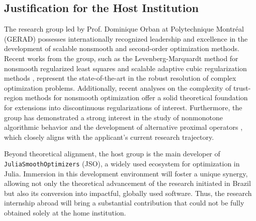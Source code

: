 \subsection{Justification for the Host Institution}
The research group led by Prof. Dominique Orban at Polytechnique Montréal (GERAD) possesses internationally recognized leadership and excellence in the development of scalable nonsmooth and second-order optimization methods. Recent works from the group, such as the Levenberg-Marquardt method for nonsmooth regularized least squares \cite{aravkin2024levenberg} and scalable adaptive cubic regularization methods \cite{dussault2024scalable}, represent the state-of-the-art in the robust resolution of complex optimization problems. Additionally, recent analyses on the complexity of trust-region methods for nonsmooth optimization \cite{leconte2023complexity} offer a solid theoretical foundation for extensions into discontinuous regularizations of interest. Furthermore, the group has demonstrated a strong interest in the study of nonmonotone algorithmic behavior and the development of alternative proximal operators \cite{Leconte_2024}, which closely aligns with the applicant's current research trajectory.

Beyond theoretical alignment, the host group is the main developer of \texttt{JuliaSmoothOptimizers} (JSO), a widely used ecosystem for optimization in Julia. Immersion in this development environment will foster a unique synergy, allowing not only the theoretical advancement of the research initiated in Brazil but also its conversion into impactful, globally used software. Thus, the research internship abroad will bring a substantial contribution that could not be fully obtained solely at the home institution.
